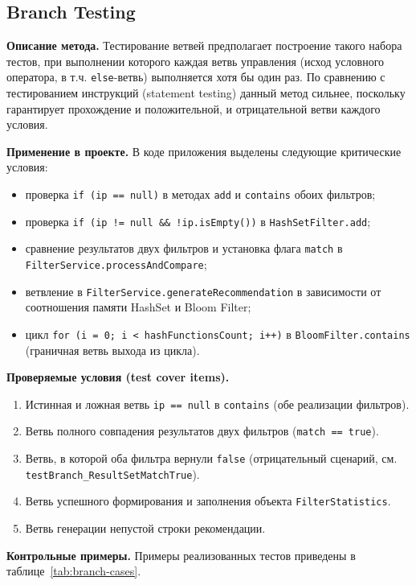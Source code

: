 \subsection{Branch Testing} \label{ch3:sec2:branch}

\textbf{Описание метода.} Тестирование ветвей предполагает построение такого набора тестов, при выполнении которого каждая ветвь управления (исход условного оператора, в т.ч. \texttt{else}-ветвь) выполняется хотя бы один раз. По сравнению с тестированием инструкций (statement testing) данный метод сильнее, поскольку гарантирует прохождение и положительной, и отрицательной ветви каждого условия.

\textbf{Применение в проекте.} В коде приложения выделены следующие критические условия:
\begin{itemize}
    \item проверка \texttt{if (ip == null)} в методах \texttt{add} и \texttt{contains} обоих фильтров;
    \item проверка \texttt{if (ip != null \&\& !ip.isEmpty())} в \texttt{HashSetFilter.add};
    \item сравнение результатов двух фильтров и установка флага \texttt{match} в \texttt{FilterService.processAndCompare};
    \item ветвление в \texttt{FilterService.generateRecommendation} в зависимости от соотношения памяти HashSet и Bloom Filter;
    \item цикл \texttt{for (i = 0; i < hashFunctionsCount; i++)} в \texttt{BloomFilter.contains} (граничная ветвь выхода из цикла).
\end{itemize}

\textbf{Проверяемые условия (test cover items).}
\begin{enumerate}
    \item Истинная и ложная ветвь \texttt{ip == null} в \texttt{contains} (обе реализации фильтров).
    \item Ветвь полного совпадения результатов двух фильтров (\texttt{match == true}).
    \item Ветвь, в которой оба фильтра вернули \texttt{false} (отрицательный сценарий, см. \texttt{testBranch\_ResultSetMatchTrue}).
    \item Ветвь успешного формирования и заполнения объекта \texttt{FilterStatistics}.
    \item Ветвь генерации непустой строки рекомендации.
\end{enumerate}

\textbf{Контрольные примеры.} Примеры реализованных тестов приведены в таблице~\ref{tab:branch-cases}.

